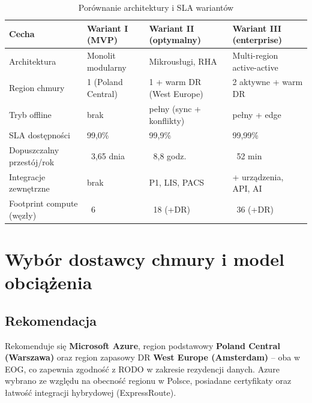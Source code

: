 \begin{table}[h]
\centering
\small
\renewcommand{\arraystretch}{1.2}
\begin{tabular}{|L{3.2cm}|L{3.8cm}|L{3.8cm}|L{3.8cm}|}
\hline
{}\textbf{Cecha} & \textbf{Wariant I (MVP)} & \textbf{Wariant II (optymalny)} & \textbf{Wariant III (enterprise)} \\
\hline
Architektura & Monolit modularny & Mikrousługi, RHA & Multi-region active-active \\
\hline
Region chmury & 1 (Poland Central) & 1 + warm DR (West Europe) & 2 aktywne + warm DR \\
\hline
Tryb offline & brak & pełny (sync + konflikty) & pełny + edge \\
\hline
SLA dostępności & 99,0\% & 99,9\% & 99,99\% \\
\hline
Dopuszczalny przestój/rok & ~3,65 dnia & ~8,8 godz. & ~52 min \\
\hline
Integracje zewnętrzne & brak & P1, LIS, PACS & + urządzenia, API, AI \\
\hline
Footprint compute (węzły) & ~6 & ~18 (+DR) & ~36 (+DR) \\
\hline
\end{tabular}
\caption{Porównanie architektury i SLA wariantów}
\label{tab:architektura}
\end{table}

\section{Wybór dostawcy chmury i model obciążenia}

\subsection{Rekomendacja}

Rekomenduje się \textbf{Microsoft Azure}, region podstawowy \textbf{Poland Central (Warszawa)} oraz region zapasowy DR \textbf{West Europe (Amsterdam)} -- oba w EOG, co zapewnia zgodność z RODO w zakresie rezydencji danych. Azure wybrano ze względu na obecność regionu w Polsce, posiadane certyfikaty oraz łatwość integracji hybrydowej (ExpressRoute).

